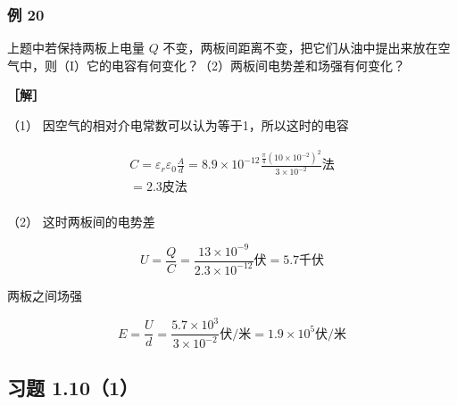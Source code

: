 \subsubsection{例 20}\label{ux4f8b-20}

上题中若保持两板上电量 \(Q\)
不变，两板间距离不变，把它们从油中提出来放在空气中，则（I）它的电容有何变化？（2）两板间电势差和场强有何变化？

\textbf{［解］}

（1） 因空气的相对介电常数可以认为等于1，所以这时的电容

\[
\begin{array}{l} C=\varepsilon_{r}\varepsilon_{0}\frac{A}{d}= 8.9 \times 10^{- 12} \frac{\frac{\pi}{4} (10 \times 10^{- 2})^{2}}{3 \times 10^{- 2}} \text{法} \\ = 2.3 \text{皮法} \\ \end{array}
\]

（2） 这时两板间的电势差

\[
U = \frac{Q}{C} = \frac{13 \times 10^{- 9}}{2.3 \times 10^{- 12}} \text{伏} = 5.7 \text{千伏}
\]

两板之间场强

\[
E = \frac{U}{d} = \frac{5.7 \times 10^{3}}{3 \times 10^{- 2}} \text{伏/米} = 1.9 \times 10^{5} \text{伏/米}
\]

\subsection{习题 1.10（1）}\label{ux4e60ux9898-1.101}

